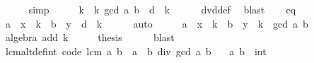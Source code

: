 \begin{isabellebody}
\ \ \ \ \isamarkupfalse%
\ simp\isanewline
\ \ \isamarkupfalse%
\ \isamarkupfalse%
\ k\ \ k{\isacharcolon}{\kern0pt}\ {\isachardoublequoteopen}gcd\ a\ b\ {\isacharequal}{\kern0pt}\ d\ {\isacharasterisk}{\kern0pt}\ k{\isachardoublequoteclose}\isanewline
\ \ \ \ \isamarkupfalse%
\ dvd{\isacharunderscore}{\kern0pt}def\ \isamarkupfalse%
\ blast\isanewline
\ \ \isamarkupfalse%
\ eq\ \isamarkupfalse%
\ {\isachardoublequoteopen}a\ {\isacharasterisk}{\kern0pt}\ x\ {\isacharasterisk}{\kern0pt}\ k\ {\isacharequal}{\kern0pt}\ {\isacharparenleft}{\kern0pt}b\ {\isacharasterisk}{\kern0pt}\ y\ {\isacharplus}{\kern0pt}\ d{\isacharparenright}{\kern0pt}\ {\isacharasterisk}{\kern0pt}\ k{\isachardoublequoteclose}\isanewline
\ \ \ \ \isamarkupfalse%
\ auto\isanewline
\ \ \isamarkupfalse%
\ \isamarkupfalse%
\ {\isachardoublequoteopen}a\ {\isacharasterisk}{\kern0pt}\ {\isacharparenleft}{\kern0pt}x\ {\isacharasterisk}{\kern0pt}\ k{\isacharparenright}{\kern0pt}\ {\isacharequal}{\kern0pt}\ b\ {\isacharasterisk}{\kern0pt}\ {\isacharparenleft}{\kern0pt}y\ {\isacharasterisk}{\kern0pt}\ k{\isacharparenright}{\kern0pt}\ {\isacharplus}{\kern0pt}\ gcd\ a\ b{\isachardoublequoteclose}\isanewline
\ \ \ \ \isamarkupfalse%
\ {\isacharparenleft}{\kern0pt}algebra\ add{\isacharcolon}{\kern0pt}\ k{\isacharparenright}{\kern0pt}\isanewline
\ \ \isamarkupfalse%
\ \isamarkupfalse%
\ {\isacharquery}{\kern0pt}thesis\isanewline
\ \ \ \ \isamarkupfalse%
\ blast\isanewline
{}\isamarkupfalse%
%
\endisatagproof
{\isafoldproof}%
%
\isadelimproof
%
\endisadelimproof
%
\isadelimdocument
%
\endisadelimdocument
%
\isatagdocument
%
\isamarkuptrue%
%
\endisatagdocument
{\isafolddocument}%
%
\isadelimdocument
%
\endisadelimdocument
{}\isamarkupfalse%
\ lcm{\isacharunderscore}{\kern0pt}altdef{\isacharunderscore}{\kern0pt}int\ {\isacharbrackleft}{\kern0pt}code{\isacharbrackright}{\kern0pt}{\isacharcolon}{\kern0pt}\ {\isachardoublequoteopen}lcm\ a\ b\ {\isacharequal}{\kern0pt}\ {\isasymbar}a{\isasymbar}\ {\isacharasterisk}{\kern0pt}\ {\isasymbar}b{\isasymbar}\ div\ gcd\ a\ b{\isachardoublequoteclose}\isanewline
\ \ \ a\ b\ {\isacharcolon}{\kern0pt}{\isacharcolon}{\kern0pt}\ int\isanewline
%
\isadelimproof
\ \ %
\endisadelimproof
%
\isatagproof
{}\isamarkupfalse%

\end{isabellebody}
